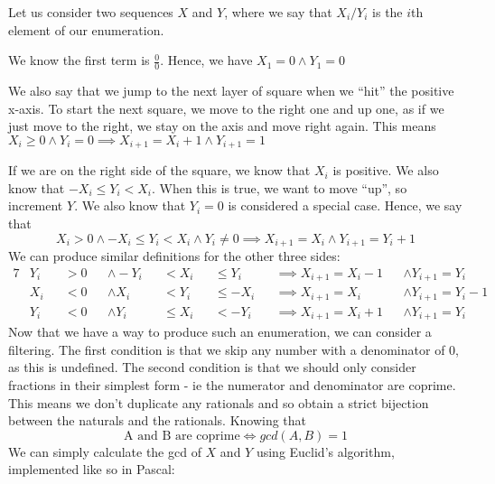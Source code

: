 \documentclass[fleqn,a4paper,11pt]{article}
\begin{document}
    Let us consider two sequences \(X\) and \(Y\), where we say that
    \(X_i / Y_i\) is the \(i\)th element of our enumeration.

    We know the first term is \(\frac{0}{0}\). Hence, we have \(X_1 = 0 \land Y_1
    = 0\)

    We also say that we jump to the next layer of square when we ``hit'' the
    positive x-axis. To start the next square, we move to the right one and up
    one, as if we just move to the right, we stay on the axis and move right
    again. This means
    \(X_i \geq 0 \land Y_i = 0 \implies X_{i + 1} = X_i + 1 \land Y_{i + 1} =
    1\)

    If we are on the right side of the square, we know that \(X_i\) is positive.
    We also know that \(-X_i \leq Y_i < X_i\). When this is true, we want to move
    ``up'', so increment \(Y\). We also know that \(Y_i = 0\) is considered a
    special case. Hence, we say that
    \begin{equation}
      X_i > 0 \land
      -X_i \leq Y_i < X_i \land
      Y_i \neq 0
    \implies
      X_{i + 1} = X_i \land
      Y_{i + 1} = Y_i + 1
    \end{equation}
    We can produce similar definitions for the other three sides:
    \begin{alignat*}{7}
    &Y_i &&> 0 &&\land -Y_i &&< X_i &&\leq Y_i &&\implies X_{i + 1} = X_i - 1 &&\land Y_{i + 1} = Y_i \\
    &X_i &&< 0 &&\land X_i &&< Y_i &&\leq -X_i &&\implies X_{i + 1} = X_i &&\land Y_{i + 1} = Y_i - 1 \\
    &Y_i &&< 0 &&\land Y_i &&\leq X_i &&< -Y_i &&\implies X_{i + 1} = X_i + 1 &&\land Y_{i + 1} = Y_i
    \end{alignat*}
    Now that we have a way to produce such an enumeration, we can consider a
    filtering. The first condition is that we skip any number with a
    denominator of 0, as this is undefined. The second condition is that we
    should only consider fractions in their simplest form - ie the numerator
    and denominator are coprime. This means we don't duplicate any rationals
    and so obtain a strict bijection between the naturals and the rationals.
    Knowing that
    \begin{equation}
        \text{A and B are coprime} \Leftrightarrow gcd(A, B) = 1
    \end{equation}
    We can simply calculate the gcd of \(X\) and \(Y\) using Euclid's algorithm,
    implemented like so in Pascal:
\end{document}

